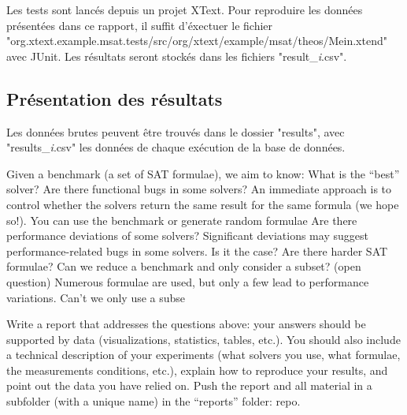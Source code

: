 \documentclass[11pt,a4paper]{article}
\begin{document}
Les tests sont lancés depuis un projet XText. Pour reproduire les données présentées dans ce rapport, il suffit d'éxectuer le fichier "org.xtext.example.msat.tests/src/org/xtext/example/msat/theos/Mein.xtend" avec JUnit. Les résultats seront stockés dans les fichiers "result\_\textit{i}.csv".


\subsection{Présentation des résultats}

Les données brutes peuvent être trouvés dans le dossier "results", avec "results_\textit{i}.csv" les données de chaque exécution de la base de données.


Given a benchmark (a set of SAT formulae), we aim to know:
 What is the “best” solver?
 Are there functional bugs in some solvers?
 An immediate approach is to control whether the solvers return the same
result for the same formula (we hope so!). You can use the benchmark or
generate random formulae
 Are there performance deviations of some solvers?
 Significant deviations may suggest performance-related bugs in some
solvers. Is it the case?
 Are there harder SAT formulae?
 Can we reduce a benchmark and only consider a subset? (open question)
 Numerous formulae are used, but only a few lead to performance variations.
Can’t we only use a subse

Write a report that addresses the questions above: your answers should be
supported by data (visualizations, statistics, tables, etc.). You should also include a
technical description of your experiments (what solvers you use, what formulae, the
measurements conditions, etc.), explain how to reproduce your results, and point out
the data you have relied on. Push the report and all material in a subfolder (with a
unique name) in the “reports” folder:
repo.
\end{document}
